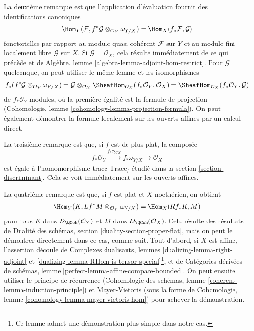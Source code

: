 \medskip\noindent
La deuxième remarque est que l'application d'évaluation fournit
des identifications canoniques
$$
\Hom_Y(\mathcal{F}, f^*\mathcal{G} \otimes_{\mathcal{O}_Y} \omega_{Y/X})
=
\Hom_X(f_*\mathcal{F}, \mathcal{G})
$$
fonctorielles par rapport au module quasi-cohérent $\mathcal{F}$ sur $Y$
et au module fini localement libre $\mathcal{G}$ sur $X$.
Si $\mathcal{G} = \mathcal{O}_X$, cela résulte immédiatement
de ce qui précède et de
Algèbre, lemme \ref{algebra-lemma-adjoint-hom-restrict}.
Pour $\mathcal{G}$ quelconque, on peut utiliser le même lemme et les
isomorphismes
$$
f_*(f^*\mathcal{G} \otimes_{\mathcal{O}_Y} \omega_{Y/X}) =
\mathcal{G} \otimes_{\mathcal{O}_X}
\SheafHom_{\mathcal{O}_X}(f_*\mathcal{O}_Y, \mathcal{O}_X) =
\SheafHom_{\mathcal{O}_X}(f_*\mathcal{O}_Y, \mathcal{G})
$$
de $f_*\mathcal{O}_Y$-modules, où la première égalité est la
formule de projection
(Cohomologie, lemme \ref{cohomology-lemma-projection-formula}).
On peut également démontrer la formule localement sur les ouverts affines par
un calcul direct.

\medskip\noindent
La troisième remarque est que, si $f$ est de plus plat, la
composée
$$
f_*\mathcal{O}_Y \xrightarrow{f_*\tau_{Y/X}} f_*\omega_{Y/X}
\longrightarrow \mathcal{O}_X
$$
est égale à l'homomorphisme trace $\text{Trace}_f$ étudié dans la
section \ref{section-discriminant}. Cela se voit immédiatement
sur les ouverts affines.

\medskip\noindent
La quatrième remarque est que, si $f$ est plat et $X$ noethérien, on
obtient
$$
\Hom_Y(K, Lf^*M \otimes_{\mathcal{O}_Y} \omega_{Y/X})
=
\Hom_X(Rf_*K, M)
$$
pour tous $K$ dans $D_\QCoh(\mathcal{O}_Y)$ et $M$ dans $D_\QCoh(\mathcal{O}_X)$.
Cela résulte des résultats de
Dualité des schémas, section \ref{duality-section-proper-flat},
mais on peut le démontrer directement dans ce cas, comme suit.
Tout d'abord, si $X$ est affine, l'assertion découle de
Complexes dualisants, lemmes \ref{dualizing-lemma-right-adjoint} et
\ref{dualizing-lemma-RHom-is-tensor-special}\footnote{Ce lemme admet
une démonstration plus simple dans notre cas.}, et de
Catégories dérivées de schémas, lemme \ref{perfect-lemma-affine-compare-bounded}.
On peut ensuite utiliser le principe de récurrence
(Cohomologie des schémas, lemme \ref{coherent-lemma-induction-principle})
et Mayer-Vietoris
(sous la forme de Cohomologie, lemme \ref{cohomology-lemma-mayer-vietoris-hom})
pour achever la démonstration.







